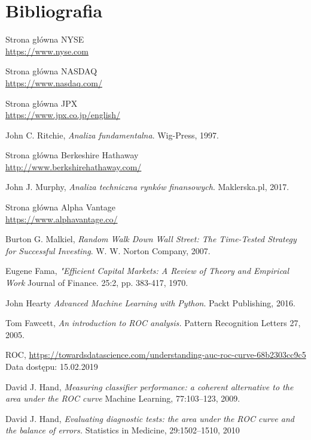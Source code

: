 \documentclass[a4paper, twoside, 11pt, openright]{article}
\begin{document}
\section{Bibliografia}
\begin{thebibliography}{9}
  
Strona główna NYSE
\\\url{https://www.nyse.com}
 
Strona główna NASDAQ
\\\url{https://www.nasdaq.com/}

Strona główna JPX
\\\url{https://www.jpx.co.jp/english/}

  John C. Ritchie,
  \textit{Analiza fundamentalna}.
  Wig-Press,
  1997.
  
Strona główna Berkeshire Hathaway
\\\url{http://www.berkshirehathaway.com/}

  John J. Murphy,
  \textit{Analiza techniczna rynków finansowych}.
  Maklerska.pl,
  2017.

Strona główna Alpha Vantage
\\\url{https://www.alphavantage.co/}

  Burton G. Malkiel,
  \textit{Random Walk Down Wall Street: The Time-Tested Strategy for Successful Investing}.
  W. W. Norton Company,
  2007.

  Eugene Fama,
  \textit{"Efficient Capital Markets: A Review of Theory and Empirical Work}
  Journal of Finance. 25:2, pp. 383-417, 1970.

  John Hearty
  \textit{Advanced Machine Learning with Python}.
  Packt Publishing,
  2016.

	Tom Fawcett, 
  \textit{An introduction to ROC analysis.}
  Pattern Recognition Letters 27,
  2005.

	ROC, \url{https://towardsdatascience.com/understanding-auc-roc-curve-68b2303cc9c5} 
	Data dostępu: 15.02.2019

	David J. Hand, 
  \textit{Measuring classifier performance: a coherent alternative to the area under the ROC curve}
  Machine Learning, 77:103–123, 2009.

	David J. Hand, 
  \textit{Evaluating diagnostic tests: the area under the ROC curve and the balance of errors.}
 Statistics in Medicine, 29:1502–1510, 2010


\end{thebibliography}
\end{document}
